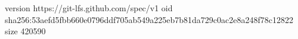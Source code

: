 version https://git-lfs.github.com/spec/v1
oid sha256:53aefd5fbb660e0796ddf705ab549a225eb7b81da729c0ac2e8a248f78c12822
size 420590
